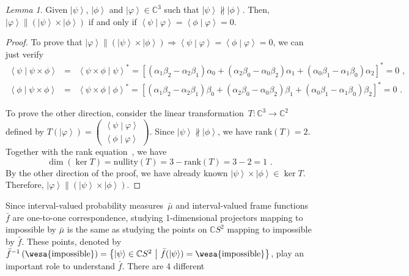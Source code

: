 \documentclass{article}
\theoremstyle{remark}
\newtheorem{lemma}{Lemma}
\newcommand{\imposs}{{\mbox{\wesa{impossible}}}}
\newcommand{\ket}[1]{{\left\vert{#1}\right\rangle}}
\newcommand{\ip}[2]{\ensuremath{\left\langle{#1}\middle\vert{#2}\right\rangle}}
\newcommand{\set}[2]{\ensuremath{\left\{ {#1}~\middle|~{#2}\right\} }}
\begin{document}
\begin{lemma}Given $\ket{\psi}$, $\ket{\phi}$ and $\ket{\varphi}\in\mathbb{C}^{3}$
such that $\ket{\psi}\nparallel\ket{\phi}$. Then, $\ket{\varphi}\parallel\left(\ket{\psi}\times\ket{\phi}\right)$
if and only if $\ip{\psi}{\varphi}=\ip{\phi}{\varphi}=0$.\end{lemma}
\begin{proof}
To prove that $\ket{\varphi}\parallel\left(\ket{\psi}\times\ket{\phi}\right)\Rightarrow\ip{\psi}{\varphi}=\ip{\phi}{\varphi}=0$,
we can just verify 
\begin{eqnarray*}
\ip{\psi}{\psi\times\phi} & = & \ip{\psi\times\phi}{\psi}^{*}=\left[\left(\alpha_{1}\beta_{2}-\alpha_{2}\beta_{1}\right)\alpha_{0}+\left(\alpha_{2}\beta_{0}-\alpha_{0}\beta_{2}\right)\alpha_{1}+\left(\alpha_{0}\beta_{1}-\alpha_{1}\beta_{0}\right)\alpha_{2}\right]^{*}=0\textrm{ ,}\\
\ip{\phi}{\psi\times\phi} & = & \ip{\psi\times\phi}{\phi}^{*}=\left[\left(\alpha_{1}\beta_{2}-\alpha_{2}\beta_{1}\right)\beta_{0}+\left(\alpha_{2}\beta_{0}-\alpha_{0}\beta_{2}\right)\beta_{1}+\left(\alpha_{0}\beta_{1}-\alpha_{1}\beta_{0}\right)\beta_{2}\right]^{*}=0\textrm{ .}
\end{eqnarray*}

To prove the other direction, consider the linear transformation~$T:\mathbb{C}^{3}\rightarrow\mathbb{C}^{2}$
defined by $T\left(\ket{\varphi}\right)=\begin{pmatrix}\ip{\psi}{\varphi}\\
\ip{\phi}{\varphi}
\end{pmatrix}$. Since $\ket{\psi}\nparallel\ket{\phi}$, we have $\mathrm{rank}\left(T\right)=2$.
Together with the rank equation~\cite{FraleighBeauregard1995}, we
have
\[
\dim\left(\ker T\right)=\mathrm{nullity}\left(T\right)=3-\mathrm{rank}\left(T\right)=3-2=1\textrm{ .}
\]
By the other direction of the proof, we have already known $\ket{\psi}\times\ket{\phi}\in\ker T$.
Therefore, $\ket{\varphi}\parallel\left(\ket{\psi}\times\ket{\phi}\right)$.
\end{proof}
Since interval-valued probability measures~$\bar{\mu}$ and interval-valued
frame functions~$\bar{f}$ are one-to-one correspondence, studying
1-dimensional projectors mapping to impossible by $\bar{\mu}$ is
the same as studying the points on $\mathbb{C}S^{2}$ mapping to impossible
by $\bar{f}$. These points, denoted by $\bar{f}^{-1}\left(\imposs\right)=\set{\ket{\psi}\in\mathbb{C}S^{2}}{\bar{f}(\ket{\psi})=\imposs}$,
play an important role to understand $\bar{f}$. There are 4 different
\end{document}
